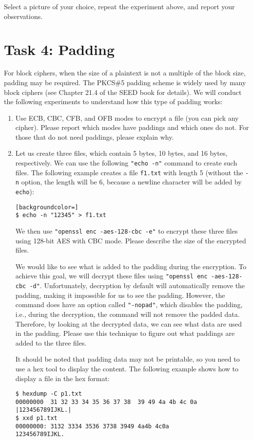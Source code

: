 Select a  picture of your choice, repeat the experiment above, 
and report your observations. 




\section{Task 4: Padding}

For block ciphers, when the size of a plaintext is not a multiple
of the block size, padding may be required. 
The PKCS\#5 padding scheme is widely used by many block 
ciphers (see Chapter 21.4 of the SEED book for details). 
We will conduct the following experiments to 
understand how this type of padding works:

\begin{enumerate}
\item Use ECB, CBC, CFB, and OFB modes to encrypt a file (you can pick
any cipher).  Please report which modes have paddings and which ones 
do not. For those that do not need paddings, please explain why.


\item Let us create three files, which contain 5 bytes, 10 bytes, and 16 bytes, respectively. 
We can use the following \texttt{"echo -n"} command to create such files. The following example
creates a file \texttt{f1.txt} with length 5 (without the \texttt{-n} option, the length will
be 6, because a newline character will be added by \texttt{echo}):  

\begin{lstlisting}[backgroundcolor=]
$ echo -n "12345" > f1.txt
\end{lstlisting}

We then use \texttt{"openssl enc -aes-128-cbc -e"} to encrypt these three files using 
128-bit AES with CBC mode.  Please describe
the size of the encrypted files. 

We would like to see what is added to the padding during the encryption. To achieve
this goal, we will decrypt these files using \texttt{"openssl enc -aes-128-cbc -d"}.
Unfortunately, decryption by default will automatically remove the padding, making it 
impossible for us to see the padding. However, the command does have an option called
\texttt{"-nopad"}, which disables the padding, i.e., during the decryption, the command will not 
remove the padded data. Therefore, by looking at the decrypted 
data, we can see what data are used in the padding. 
Please use this technique to figure out what paddings are added to the three files. 

It should be noted that padding data may not be printable, so you need to
use a hex tool to display the content. The following example shows 
how to display a file in the hex format:

\begin{lstlisting}
$ hexdump -C p1.txt
00000000  31 32 33 34 35 36 37 38  39 49 4a 4b 4c 0a   |123456789IJKL.|
$ xxd p1.txt
00000000: 3132 3334 3536 3738 3949 4a4b 4c0a            123456789IJKL.
\end{lstlisting}
 
\end{enumerate}
